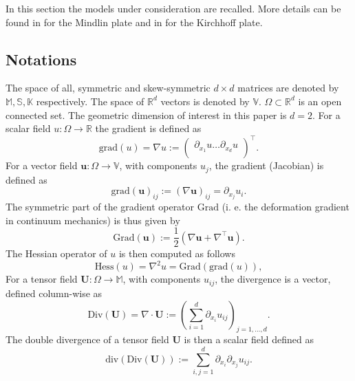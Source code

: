 \documentclass{ifacconf}
\begin{document}
In this section the models under consideration are recalled. More details can be found in  \cite{BRUGNOLI2019940} for the Mindlin plate and in \cite{BRUGNOLI2019961} for the Kirchhoff plate. 

\subsection{Notations}
The space of all, symmetric and skew-symmetric $d\times d$ matrices are denoted by $\mathbb{M}, \mathbb{S}, \mathbb{K}$ respectively. The space of $\mathbb{R}^d$ vectors is denoted by $\mathbb{V}$. $\Omega \subset \mathbb{R}^d$ is an open connected set. The geometric dimension of interest in this paper is $d=2$. For a scalar field $u: \Omega \rightarrow \mathbb{R}$ the gradient is defined as 
\begin{equation*}
\mathrm{grad}(u) =  \nabla u := \begin{pmatrix}
\partial_{x_1} u \dots \partial_{x_d} u \\
\end{pmatrix}^\top.
\end{equation*}
For a vector field $\bm{u}: \Omega \rightarrow \mathbb{V}$, with components $u_j$, the gradient (Jacobian) is defined as
\begin{equation*}
\mathrm{grad}(\bm{u})_{i j}:= (\nabla \bm{u})_{ij} = \partial_{x_j} u_i.
\end{equation*}
The symmetric part of the gradient operator $\mathrm{Grad}$ (i. e. the deformation gradient in continuum mechanics) is thus given by
\begin{equation*}
\mathrm{Grad}(\bm{u}) := \frac{1}{2} \left(\nabla \bm{u} + \nabla^\top \bm{u} \right).
\end{equation*}
The Hessian operator of $u$ is then computed as follows
\begin{equation*}
\mathrm{Hess}(u) = \nabla^2 u = \mathrm{Grad}(\mathrm{grad}(u)),
\end{equation*}
For a tensor field $\bm{U}: \Omega \rightarrow \mathbb{M}$, with components $u_{ij}$, the divergence is a vector, defined column-wise as
\begin{equation*}
\mathrm{Div}(\bm U) = \nabla \cdot \bm{U} := \left( \sum_{i = 1}^d \partial_{x_i} u_{ij} \right)_{j = 1, \dots, d}.
\end{equation*}
The double divergence of a tensor field $\bm{U}$ is then a scalar field defined as
\begin{equation*}
\mathrm{div}(\mathrm{Div}(\bm U)):= \sum_{i, j = 1}^d \partial_{x_i} \partial_{x_j} u_{ij}.
\end{equation*}
\end{document}
